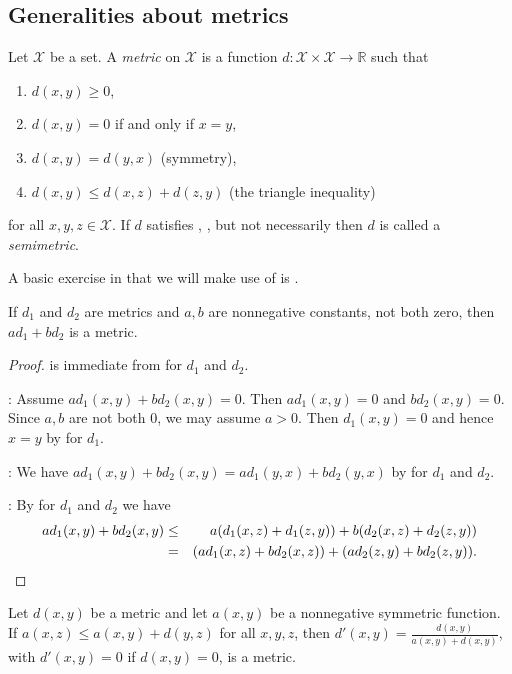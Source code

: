 		\subsection{Generalities about metrics}
		\begin{definition}\label{october2020}
		Let $\mathcal X$ be a set.
			A \emph{metric} on $\mathcal X$ is a function
			$d : \mathcal X \times \mathcal X \to \mathbb R$ such that
			\begin{enumerate}
				\item\label{met-nonneg} $d(x, y) \ge 0$,
				\item\label{met-0} $d(x, y) = 0$ if and only if $x = y$,
				\item\label{met-symm} $d(x, y) = d(y, x)$ (symmetry),
				\item\label{met-tri} $d(x,y)\le d(x,z)+d(z,y)$ (the triangle inequality)
			\end{enumerate}
			for all $x,y,z\in\mathcal X$.
			If $d$ satisfies , ,  but not necessarily  then $d$ is called a \emph{semimetric}.
		\end{definition}
		A basic exercise in  that we will make use of is .
		\begin{theorem}\label{lin-comb-metric}
			 If $d_1$ and $d_2$ are metrics and $a,b$ are nonnegative constants, not both zero, then $ad_1+bd_2$ is a metric.
		\end{theorem}
		\begin{proof}
			 is immediate from  for $d_1$ and $d_2$.

			: Assume $ad_1(x,y)+bd_2(x,y)=0$. Then $ad_1(x,y)=0$ and $bd_2(x,y)=0$.
			Since $a,b$ are not both 0, we may assume $a>0$. Then $d_1(x,y)=0$ and hence $x=y$ by  for $d_1$.

			: We have $ad_1(x,y)+bd_2(x,y)=ad_1(y,x)+bd_2(y,x)$ by  for $d_1$ and $d_2$.

			: By  for $d_1$ and $d_2$ we have
			\begin{eqnarray*}
			ad_1(x,y)+bd_2(x,y)&\le& a(d_1(x,z)+d_1(z,y))+b(d_2(x,z)+d_2(z,y))\\ &=& (ad_1(x,z)+bd_2(x,z)) + (ad_2(z,y)+bd_2(z,y)).\qedhere			 
			\end{eqnarray*}
		\end{proof}
		\begin{lemma}\label{mar29-2022}
			Let $d(x,y)$ be a metric and let $a(x,y)$ be a nonnegative symmetric function. If $a(x,z)\le a(x,y)+d(y,z)$ for all $x,y,z$,
			then $d'(x,y)=\frac{d(x,y)}{a(x,y)+d(x,y)}$,
			with $d'(x,y)=0$ if $d(x,y)=0$, is a metric.
		\end{lemma}
